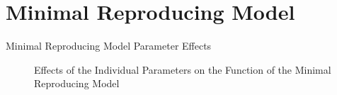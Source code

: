 
\section{Minimal Reproducing Model}

\begin{frame}{Minimal Reproducing Model Parameter Effects}
    \begin{figure}
        \centering
        \caption{Effects of the Individual Parameters on the Function of the Minimal Reproducing Model}
    \end{figure}
\end{frame}
